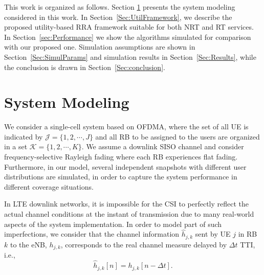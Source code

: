 \documentclass[conference]{IEEEtran}
\newcommand{\SecRef}[1]{Section~\ref{#1}}
\begin{document}
This work is organized as follows. Section \ref{Sec:SystemModeling} presents the system modeling considered in this work. In \SecRef{Sec:UtilFramework}, we describe the proposed utility-based \ac{RRA} framework suitable for both \ac{NRT} and \ac{RT} services. In \SecRef{sec:Performance} we show the algorithms simulated for comparison with our proposed one. Simulation assumptions are shown in \SecRef{Sec:SimulParams} and simulation results in \SecRef{Sec:Results}, while the conclusion is drawn in \SecRef{Sec:conclusion}.

\section{System Modeling}
\label{Sec:SystemModeling}
We consider a single-cell system based on \ac{OFDMA}, where the set of all \ac{UE} is indicated by $\mathcal{J} = \{1, 2, \cdots, J\}$ and all \ac{RB} to be assigned to the users are organized in a set $\mathcal{K} = \{1, 2, \cdots, K\}$.
We assume a downlink \ac{SISO} channel and consider frequency-selective Rayleigh fading where each \ac{RB} experiences flat fading. Furthermore, in our model, several independent snapshots with different user distributions are simulated, in order to capture the system performance in different coverage situations.
%

%

In \ac{LTE} downlink networks, it is impossible for the \ac{CSI} to perfectly reflect the actual channel conditions at the instant of transmission due to many real-world aspects of the system implementation. In order to model part of such imperfections, we consider that the channel information $ \hat{h}_{j,k} $ sent by \ac{UE} $j$ in \ac{RB} $k$ to the \ac{eNB}, $h_{j,k}$, corresponds to the real channel measure delayed by $\Delta t$ \ac{TTI}, i.e.,
%
\begin{equation}
\hat{h}_{j,k}[n] = h_{j,k}[n -\Delta t].
\end{equation}
\end{document}
